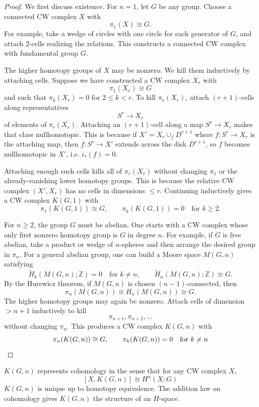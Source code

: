 \documentclass[12pt]{article}
\begin{document}
\begin{proof}
We first discuss existence. For $n=1$, let $G$ be any group. Choose a connected CW complex $X$ with
\[
\pi_1(X)\cong G.
\]
For example, take a wedge of circles with one circle for each generator of $G$, and attach $2$-cells realizing the relations. This constructs a connected CW complex with fundamental group $G$.

The higher homotopy groups of $X$ may be nonzero. We kill them inductively by attaching cells. Suppose we have constructed a CW complex $X_r$ with
\[
\pi_1(X_r)\cong G
\]
and such that $\pi_k(X_r)=0$ for $2\le k<r$. To kill $\pi_r(X_r)$, attach $(r+1)$-cells along representatives
\[
S^r\to X_r
\]
of elements of $\pi_r(X_r)$. Attaching an $(r+1)$-cell along a map $S^r\to X_r$ makes that class nullhomotopic. This is because if $X' = X_r \cup_f D^{r+1}$ where $f: S^r \to X_r$ is the attaching map, then $f:S^r \to X'$ extends across the disk $D^{r+1}$, so $f$ becomes nullhomotopic in $X'$, i.e. $i_*(f) = 0$.

Attaching enough such cells kills all of $\pi_r(X_r)$ without changing $\pi_1$ or the already-vanishing lower homotopy groups. This is because the relative CW complex $(X',X_r)$ has no cells in dimensions $\le r$. Continuing inductively gives a CW complex $K(G,1)$ with
\[
\pi_1(K(G,1))\cong G,
\qquad
\pi_k(K(G,1))=0 \quad \text{for } k\ge 2.
\]

For $n\ge 2$, the group $G$ must be abelian. One starts with a CW complex whose only first nonzero homotopy group is $G$ in degree $n$. For example, if $G$ is free abelian, take a product or wedge of $n$-spheres and then arrange the desired group in $\pi_n$. For a general abelian group, one can build a Moore space $M(G,n)$ satisfying
\[
\widetilde H_k(M(G,n);\mathbb Z)=0 \quad \text{for } k\neq n,
\qquad
\widetilde H_n(M(G,n);\mathbb Z)\cong G.
\]
By the Hurewicz theorem, if $M(G,n)$ is chosen $(n-1)$-connected, then
\[
\pi_n(M(G,n))\cong H_n(M(G,n))\cong G.
\]
The higher homotopy groups may again be nonzero. Attach cells of dimension $>n+1$ inductively to kill
\[
\pi_{n+1},\pi_{n+2},\dots
\]
without changing $\pi_n$. This produces a CW complex $K(G,n)$ with
\[
\pi_n(K(G,n))\cong G,
\qquad
\pi_k(K(G,n))=0 \quad \text{for } k\neq n \qedhere
\]
\end{proof}

\begin{theorem}
    $K(G,n)$ represents cohomology in the sense that for any CW complex $X$,
\[[X,K(G,n)]\cong H^n(X;G)
\]
$K(G,n)$ is unique up to homotopy equivalence. The addition law on cohomology gives $K(G,n)$ the structure of an $H$-space.
\end{theorem}
\end{document}
